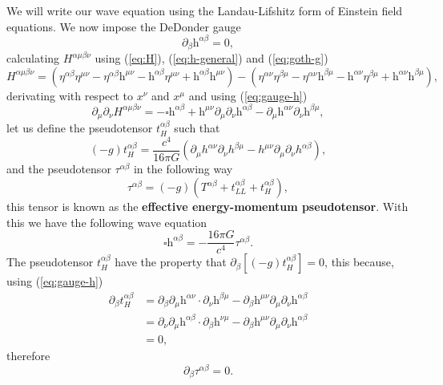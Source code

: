 We will write our wave equation using
the Landau-Lifshitz form of Einstein field equations. We now impose
the DeDonder gauge
\begin{equation}
\partial_{\beta}\text{h}^{\alpha\beta}=0,\label{eq:gauge-h}
\end{equation}
calculating $H^{\alpha\mu\beta\nu}$ using (\ref{eq:H}), (\ref{eq:h-general})
and (\ref{eq:goth-g})
\[
H^{\alpha\mu\beta\nu}=\left(\eta^{\alpha\beta}\eta^{\mu\nu}-\eta^{\alpha\beta}\text{h}^{\mu\nu}-\text{h}^{\alpha\beta}\eta^{\mu\nu}+\text{h}^{\alpha\beta}\text{h}^{\mu\nu}\right)-\left(\eta^{\alpha\nu}\eta^{\beta\mu}-\eta^{\alpha\nu}\text{h}^{\beta\mu}-\text{h}^{\alpha\nu}\eta^{\beta\mu}+\text{h}^{\alpha\nu}\text{h}^{\beta\mu}\right),
\]
derivating with respect to $x^{\nu}$ and $x^{\mu}$ and using (\ref{eq:gauge-h})
\[
\partial_{\mu}\partial_{\nu}H^{\alpha\mu\beta\nu}=-\square\text{h}^{\alpha\beta}+\text{h}^{\mu\nu}\partial_{\mu}\partial_{\nu}\text{h}^{\alpha\beta}-\partial_{\mu}\text{h}^{\alpha\nu}\partial_{\nu}\text{h}^{\beta\mu},
\]
let us define the pseudotensor $t_{H}^{\alpha\beta}$ such that
\[
\left(-g\right)t_{H}^{\alpha\beta}=\frac{c^{4}}{16\pi G}\left(\partial_{\mu}h^{\alpha\nu}\partial_{\nu}h^{\beta\mu}-h^{\mu\nu}\partial_{\mu}\partial_{\nu}h^{\alpha\beta}\right),
\]
and the pseudotensor $\tau^{\alpha\beta}$ in the following way
\[
\tau^{\alpha\beta}=\left(-g\right)\left(T^{\alpha\beta}+t_{LL}^{\alpha\beta}+t_{H}^{\alpha\beta}\right),
\]
this tensor is known as the \textbf{effective energy-momentum pseudotensor}.
With this we have the following wave equation
\begin{equation}
\square\text{h}^{\alpha\beta}=-\frac{16\pi G}{c^{4}}\tau^{\alpha\beta}.\label{eq:einstein-wave}
\end{equation}
The pseudotensor $t_{H}^{\alpha\beta}$ have the property that $\partial_{\beta}\left[\left(-g\right)t_{H}^{\alpha\beta}\right]=0$,
this because, using (\ref{eq:gauge-h})
\begin{align*}
\partial_{\beta}t_{H}^{\alpha\beta} & =\partial_{\beta}\partial_{\mu}\text{h}^{\alpha\nu}\cdot\partial_{\nu}\text{h}^{\beta\mu}-\partial_{\beta}\text{h}^{\mu\nu}\partial_{\mu}\partial_{\nu}\text{h}^{\alpha\beta}\\
\  & =\partial_{\nu}\partial_{\mu}\text{h}^{\alpha\beta}\cdot\partial_{\beta}\text{h}^{\nu\mu}-\partial_{\beta}\text{h}^{\mu\nu}\partial_{\mu}\partial_{\nu}\text{h}^{\alpha\beta}\\
\  & =0,
\end{align*}
therefore
\begin{equation}
\partial_{\beta}\tau^{\alpha\beta}=0.\label{eq:cons-tau}
\end{equation}

